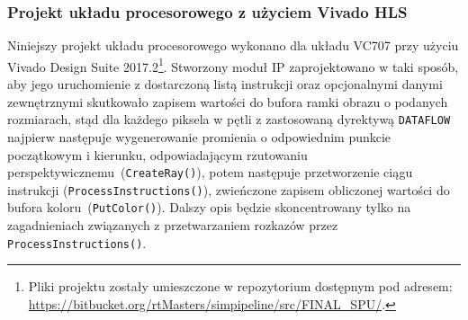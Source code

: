 \subsubsection{Projekt układu procesorowego z użyciem Vivado HLS}
Niniejszy projekt układu procesorowego wykonano dla układu VC707 przy użyciu Vivado Design Suite 2017.2\footnote{Pliki projektu zostały umieszczone w repozytorium dostępnym pod adresem:
\url{https://bitbucket.org/rtMasters/simpipeline/src/FINAL_SPU/}.}. Stworzony moduł IP zaprojektowano w taki sposób, aby jego uruchomienie z dostarczoną listą instrukcji oraz opcjonalnymi danymi zewnętrznymi skutkowało zapisem wartości do bufora ramki obrazu o podanych rozmiarach, stąd dla każdego piksela w pętli z zastosowaną dyrektywą \texttt{DATAFLOW} najpierw następuje wygenerowanie promienia o odpowiednim punkcie początkowym i kierunku, odpowiadającym rzutowaniu perspektywicznemu~(\texttt{CreateRay()}), potem następuje przetworzenie ciągu instrukcji (\texttt{ProcessInstructions()}), zwieńczone zapisem obliczonej wartości do bufora koloru~(\texttt{PutColor()}). Dalszy opis będzie skoncentrowany tylko na zagadnieniach związanych z przetwarzaniem rozkazów przez \texttt{ProcessInstructions()}.

